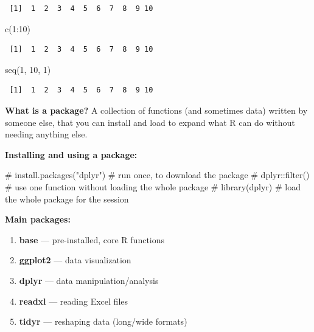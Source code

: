 \documentclass[
  letterpaper,
  DIV=11,
  numbers=noendperiod]{scrartcl}
\newenvironment{Shaded}{\begin{snugshade}}{\end{snugshade}}
\newcommand{\CommentTok}[1]{\textcolor[rgb]{0.37,0.37,0.37}{#1}}
\newcommand{\DecValTok}[1]{\textcolor[rgb]{0.68,0.00,0.00}{#1}}
\newcommand{\FunctionTok}[1]{\textcolor[rgb]{0.28,0.35,0.67}{#1}}
\newcommand{\NormalTok}[1]{\textcolor[rgb]{0.00,0.23,0.31}{#1}}
\newcommand{\SpecialCharTok}[1]{\textcolor[rgb]{0.37,0.37,0.37}{#1}}
\providecommand{\tightlist}{%
  \setlength{\itemsep}{0pt}\setlength{\parskip}{0pt}}
\begin{document}
\begin{verbatim}
 [1]  1  2  3  4  5  6  7  8  9 10
\end{verbatim}

\begin{Shaded}
\begin{Highlighting}[]
\FunctionTok{c}\NormalTok{(}\DecValTok{1}\SpecialCharTok{:}\DecValTok{10}\NormalTok{)}
\end{Highlighting}
\end{Shaded}

\begin{verbatim}
 [1]  1  2  3  4  5  6  7  8  9 10
\end{verbatim}

\begin{Shaded}
\begin{Highlighting}[]
\FunctionTok{seq}\NormalTok{(}\DecValTok{1}\NormalTok{, }\DecValTok{10}\NormalTok{, }\DecValTok{1}\NormalTok{)}
\end{Highlighting}
\end{Shaded}

\begin{verbatim}
 [1]  1  2  3  4  5  6  7  8  9 10
\end{verbatim}

\textbf{What is a package?} A collection of functions (and sometimes
data) written by someone else, that you can install and load to expand
what R can do without needing anything else.

\textbf{Installing and using a package:}

\begin{Shaded}
\begin{Highlighting}[]
\CommentTok{\# install.packages("dplyr")   \# run once, to download the package}
\CommentTok{\# dplyr::filter()              \# use one function without loading the whole package}
\CommentTok{\# library(dplyr)               \# load the whole package for the session}
\end{Highlighting}
\end{Shaded}

\textbf{Main packages:}

\begin{enumerate}
\def\labelenumi{\arabic{enumi}.}
\tightlist
\item
  \textbf{base} --- pre-installed, core R functions
\item
  \textbf{ggplot2} --- data visualization
\item
  \textbf{dplyr} --- data manipulation/analysis
\item
  \textbf{readxl} --- reading Excel files
\item
  \textbf{tidyr} --- reshaping data (long/wide formats)
\end{enumerate}
\end{document}
